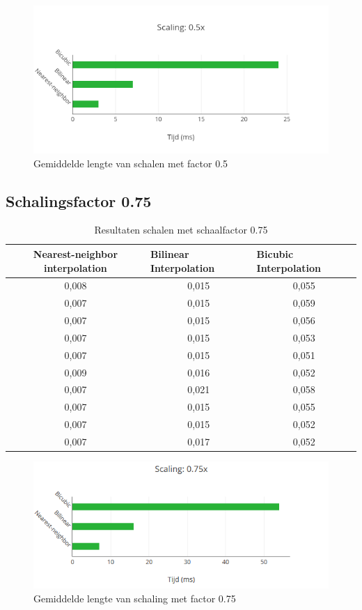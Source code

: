 \documentclass{article}
\begin{document}
\begin{figure}[H]
    \centering
    \includegraphics[width=12cm]{graphs/Scaling_05.png}
    \caption{Gemiddelde lengte van schalen met factor 0.5}
    \label{fig:my_label}
\end{figure}

\subsection{Schalingsfactor 0.75}

\begin{table}[H]
    \centering
    \begin{tabular}{ccc}
        \toprule
            Nearest-neighbor interpolation & \multicolumn{1}{l}{Bilinear Interpolation} &\multicolumn{1}{l}{Bicubic Interpolation} \\
        \midrule
            0,008 & 0,015 & 0,055 \\
            0,007 & 0,015 & 0,059 \\
            0,007 & 0,015 & 0,056 \\
            0,007 & 0,015 & 0,053 \\
            0,007 & 0,015 & 0,051 \\
            0,009 & 0,016 & 0,052 \\
            0,007 & 0,021 & 0,058 \\
            0,007 & 0,015 & 0,055 \\
            0,007 & 0,015 & 0,052 \\
            0,007 & 0,017 & 0,052 \\
    \end{tabular}
    \caption{Resultaten schalen met schaalfactor 0.75}
\end{table}

\begin{figure}[H]
    \centering
    \includegraphics[width=12cm]{graphs/Scaling_075.PNG}
    \caption{Gemiddelde lengte van schaling met factor 0.75}
    \label{fig:my_label}
\end{figure}
\end{document}
